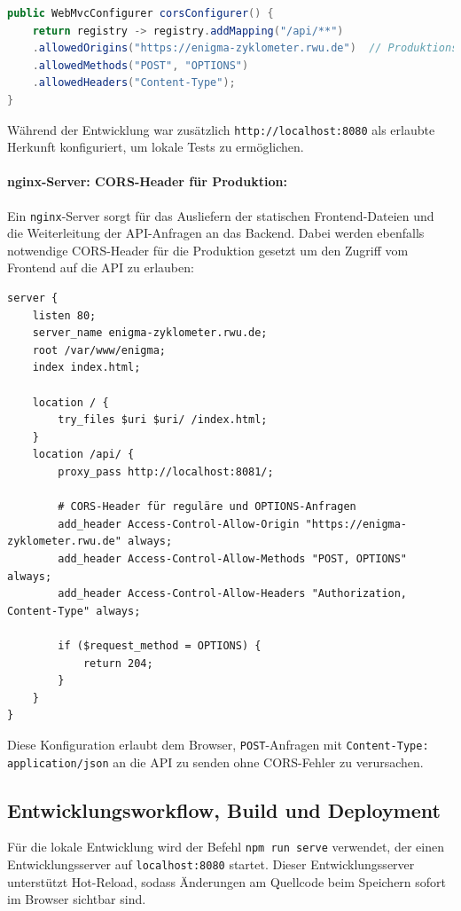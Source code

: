 \documentclass[12pt, ngerman, a4paper, numbers=noenddot]{article}
\begin{document}
\begin{lstlisting}[language=Java, caption=Spring Boot CORS-Konfiguration]
public WebMvcConfigurer corsConfigurer() {
	return registry -> registry.addMapping("/api/**")
	.allowedOrigins("https://enigma-zyklometer.rwu.de")  // Produktionsdomain
	.allowedMethods("POST", "OPTIONS")
	.allowedHeaders("Content-Type");
}
\end{lstlisting}

Während der Entwicklung war zusätzlich \lstinline|http://localhost:8080| als erlaubte Herkunft konfiguriert, um lokale Tests zu ermöglichen.


\paragraph{nginx-Server: CORS-Header für Produktion:}

Ein \lstinline|nginx|\hyp{}Server sorgt für das Ausliefern der statischen Frontend-Dateien und die Weiterleitung der API-Anfragen an das Backend. Dabei werden ebenfalls notwendige CORS-Header für die Produktion gesetzt um den Zugriff vom Frontend auf die API zu erlauben:
\newpage
\begin{lstlisting}[language=nginx, caption=Konfiguration des \lstinline|nginx|-Servers]
server {
	listen 80;
	server_name enigma-zyklometer.rwu.de;
	root /var/www/enigma;
	index index.html;
	
	location / {
		try_files $uri $uri/ /index.html;
	}
	location /api/ {
		proxy_pass http://localhost:8081/;
		
		# CORS-Header für reguläre und OPTIONS-Anfragen
		add_header Access-Control-Allow-Origin "https://enigma-zyklometer.rwu.de" always;
		add_header Access-Control-Allow-Methods "POST, OPTIONS" always;
		add_header Access-Control-Allow-Headers "Authorization, Content-Type" always;
		
		if ($request_method = OPTIONS) {
			return 204;
		}
	}
}
\end{lstlisting}

Diese Konfiguration erlaubt dem Browser, \lstinline|POST|-Anfragen mit \newline\lstinline|Content-Type: application/json| an die API zu senden ohne CORS-Fehler zu verursachen.

\subsection{Entwicklungsworkflow, Build und Deployment}

Für die lokale Entwicklung wird der Befehl \lstinline|npm run serve| verwendet, der einen Entwicklungsserver auf \lstinline|localhost:8080| startet. Dieser Entwicklungsserver unterstützt Hot-Reload, sodass Änderungen am Quellcode beim Speichern sofort im Browser sichtbar sind.
\end{document}

